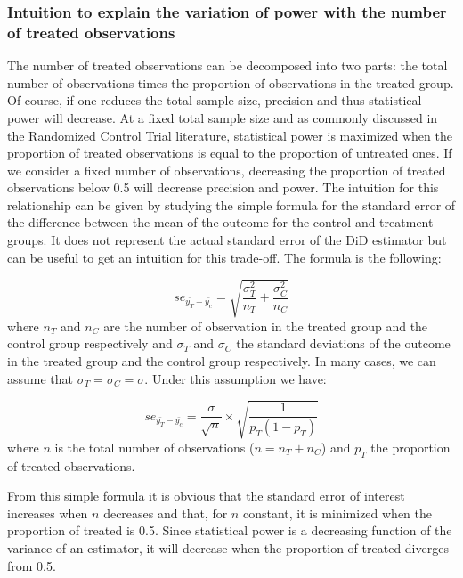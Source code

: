 \documentclass[
]{article}
\begin{document}
\hypertarget{intuition-to-explain-the-variation-of-power-with-the-number-of-treated-observations}{%
\subsubsection{Intuition to explain the variation of power with the
number of treated
observations}\label{intuition-to-explain-the-variation-of-power-with-the-number-of-treated-observations}}

The number of treated observations can be decomposed into two parts: the
total number of observations times the proportion of observations in the
treated group. Of course, if one reduces the total sample size,
precision and thus statistical power will decrease. At a fixed total
sample size and as commonly discussed in the Randomized Control Trial
literature, statistical power is maximized when the proportion of
treated observations is equal to the proportion of untreated ones. If we
consider a fixed number of observations, decreasing the proportion of
treated observations below 0.5 will decrease precision and power. The
intuition for this relationship can be given by studying the simple
formula for the standard error of the difference between the mean of the
outcome for the control and treatment groups. It does not represent the
actual standard error of the DiD estimator but can be useful to get an
intuition for this trade-off. The formula is the following:

\[se_{\bar{y_T} - \bar{y_c}} = \sqrt{\dfrac{\sigma_T^2}{n_T} + \dfrac{\sigma_C^2}{n_C}}\]
where \(n_T\) and \(n_C\) are the number of observation in the treated
group and the control group respectively and \(\sigma_T\) and
\(\sigma_C\) the standard deviations of the outcome in the treated group
and the control group respectively. In many cases, we can assume that
\(\sigma_T = \sigma_C = \sigma\). Under this assumption we have:

\[se_{\bar{y_T} - \bar{y_c}} = \dfrac{\sigma}{\sqrt{n}} \times \sqrt{\dfrac{1}{p_T(1-p_T)}}\]
where \(n\) is the total number of observations (\(n = n_T + n_C\)) and
\(p_T\) the proportion of treated observations.

From this simple formula it is obvious that the standard error of
interest increases when \(n\) decreases and that, for \(n\) constant, it
is minimized when the proportion of treated is 0.5. Since statistical
power is a decreasing function of the variance of an estimator, it will
decrease when the proportion of treated diverges from 0.5.
\end{document}
